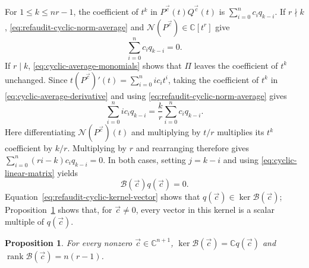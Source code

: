 \documentclass[12pt,reqno,a4paper]{amsart}
\numberwithin{equation}{section}
\numberwithin{figure}{section}
\theoremstyle{plain}
\newtheorem{proposition}[theorem]{Proposition}
\theoremstyle{definition}
\begin{document}
For $1\leq k\leq nr-1$, the coefficient of $t^k$ in
$P^{\vec c}(t)Q^{\vec c}(t)$ is $\sum_{i=0}^n c_iq_{k-i}$.
If $r\nmid k$, \eqref{eq:refaudit-cyclic-norm-average} and
$\mathscr N(P^{\vec c})\in\mathbb C[t^r]$ give
\[
 \sum_{i=0}^n c_iq_{k-i}=0.
\]
If $r\mid k$, \eqref{eq:cyclic-average-monomials} shows that
$\Pi$ leaves the coefficient of $t^k$ unchanged.
Since $t(P^{\vec c})'(t)=\sum_{i=0}^n i c_it^i$, taking the
coefficient of $t^k$ in \eqref{eq:cyclic-average-derivative} and
using \eqref{eq:refaudit-cyclic-norm-average} gives
\[
 \sum_{i=0}^n i c_iq_{k-i}
 =\frac{k}{r}\sum_{i=0}^n c_iq_{k-i}.
\]
Here differentiating $\mathscr N(P^{\vec c})(t)$ and multiplying
by $t/r$ multiplies its $t^k$ coefficient by $k/r$.
Multiplying by $r$ and rearranging therefore gives
$\sum_{i=0}^n(ri-k)c_iq_{k-i}=0$.
In both cases, setting $j=k-i$ and using
\eqref{eq:cyclic-linear-matrix} yields
\begin{equation}\label{eq:refaudit-cyclic-kernel-vector}
 \mathcal B(\vec c)q(\vec c)=0.
\end{equation}
Equation~\eqref{eq:refaudit-cyclic-kernel-vector} shows that
$q(\vec c)\in\ker\mathcal B(\vec c)$;
Proposition~\ref{prop:cyclic-constant-rank} shows that, for
$\vec c\ne0$, every vector in this kernel is a scalar multiple of
$q(\vec c)$.

\begin{proposition}\label{prop:cyclic-constant-rank}
For every nonzero $\vec c\in\mathbb C^{n+1}$,
$\ker\mathcal B(\vec c)=\mathbb Cq(\vec c)$ and
$\operatorname{rank}\mathcal B(\vec c)=n(r-1)$.
\end{proposition}
\end{document}
